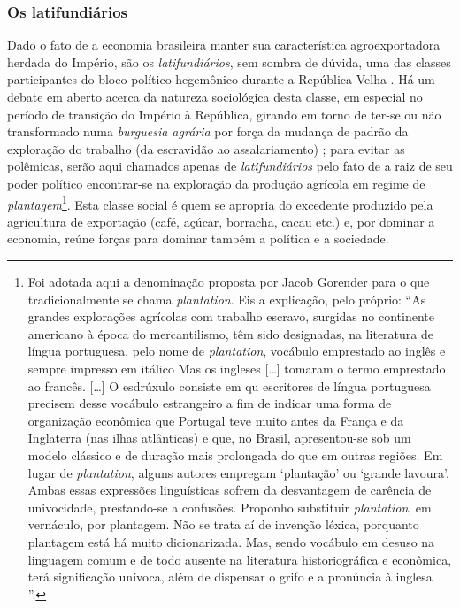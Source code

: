 \subsubsection{Os latifundiários}\label{subsubsec:clagraris}

Dado o fato de a economia brasileira manter sua característica agroexportadora herdada do Império, são os \textit{latifundiários}, sem sombra de dúvida, uma das classes participantes do bloco político hegemônico durante a República Velha \cite{gorender_burguesia_1990,oliveira_emopro_1977,CARONE1970inst}. Há um debate em aberto acerca da natureza sociológica desta classe, em especial no período de transição do Império à República, girando em torno de ter-se ou não transformado numa \textit{burguesia agrária} por força da mudança de padrão da exploração do trabalho (da escravidão ao assalariamento) \cite{gorender_burguesia_1990,oliveira_emopro_1977}; para evitar as polêmicas, serão aqui chamados apenas de \textit{latifundiários} pelo fato de a raiz de seu poder político encontrar-se na exploração da produção agrícola em regime de \textit{plantagem}\footnote{Foi adotada aqui a denominação proposta por Jacob Gorender para o que tradicionalmente se chama \textit{plantation}. Eis a explicação, pelo próprio: ``As grandes explorações agrícolas com trabalho escravo, surgidas no continente americano à época do mercantilismo, têm sido designadas, na literatura de língua portuguesa, pelo nome de \textit{plantation}, vocábulo emprestado ao inglês e sempre impresso em itálico Mas os ingleses [\dots] tomaram o termo emprestado ao francês. [\dots] O esdrúxulo consiste em qu escritores de língua portuguesa precisem desse vocábulo estrangeiro a fim de indicar uma forma de organização econômica que Portugal teve muito antes da França e da Inglaterra (nas ilhas atlânticas) e que, no Brasil, apresentou-se sob um modelo clássico e de duração mais prolongada do que em outras regiões. Em lugar de \textit{plantation}, alguns autores empregam `plantação' ou `grande lavoura'. Ambas essas expressões linguísticas sofrem da desvantagem de carência de univocidade, prestando-se a confusões. Proponho substituir \textit{plantation}, em vernáculo, por plantagem. Não se trata aí de invenção léxica, porquanto plantagem está há muito dicionarizada. Mas, sendo vocábulo em desuso na linguagem comum e de todo ausente na literatura historiográfica e econômica, terá significação unívoca, além de dispensar o grifo e a pronúncia à inglesa \cite[pp.~119-120]{gorender_escracolo_2010}''.}. Esta classe social é quem se apropria do excedente produzido pela agricultura de exportação (café, açúcar, borracha, cacau etc.) e, por dominar a economia, reúne forças para dominar também a política e a sociedade.

